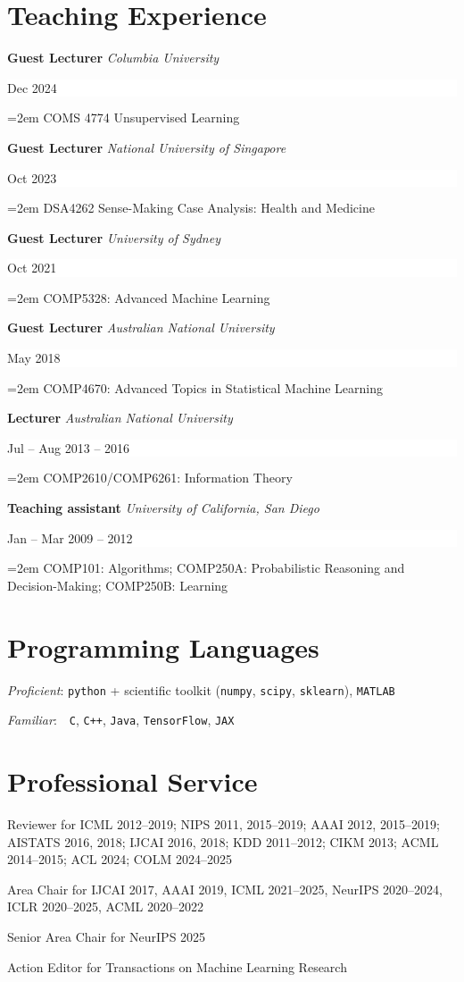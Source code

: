 \documentclass{article}
\newcommand{\NewPart}[1]{\section*{#1}}
\newcommand{\EducationEntry}[4]{
    \noindent \textbf{#1}
    \textit{#3}
    \hfill      %
    \colorbox{White}{
      \parbox{9em}{
      \hfill\color{Black}#2}} \par  %
    \noindent\hangindent=2em\hangafter=0 \small #4 %
    \normalsize \par}
\newcommand{\WorkEntry}[4]{       %
    \noindent
    \textbf{#1}
    \textit{#3} %
    \hfill      %
    \colorbox{White}{%
      \parbox{9em}{%
      \hfill\color{Black}#2}} \par   %
    \noindent\hangindent=2em\hangafter=0 \small #4 %
    \normalsize \par}
\begin{document}
\NewPart{Teaching Experience}{}

\WorkEntry
{Guest Lecturer}
{Dec 2024}
{Columbia University}
{
    COMS 4774  Unsupervised Learning
}

\WorkEntry
{Guest Lecturer}
{Oct 2023}
{National University of Singapore}
{
    DSA4262 Sense-Making Case Analysis: Health and Medicine
}

\WorkEntry
{Guest Lecturer}
{Oct 2021}
{University of Sydney}
{
    COMP5328: Advanced Machine Learning
}

\WorkEntry
{Guest Lecturer}
{May 2018}
{Australian National University}
{
    COMP4670: Advanced Topics in Statistical Machine Learning
}

\WorkEntry
{Lecturer}
{Jul -- Aug 2013 -- 2016}
{Australian National University}
{
    COMP2610/COMP6261: Information Theory
}

\WorkEntry
{Teaching assistant}
{Jan -- Mar 2009 -- 2012}
{University of California, San Diego}
{
    COMP101: Algorithms; COMP250A: Probabilistic Reasoning and Decision-Making; COMP250B: Learning
}

\NewPart{Programming Languages}{}

\emph{Proficient}: {{\tt python} + scientific toolkit ({\tt numpy}, {\tt scipy}, {\tt sklearn})},
{{\tt MATLAB}}

\noindent\emph{Familiar}: \,\ {\tt C}, {\tt C++}, {\tt Java},
{{\tt TensorFlow}},
{{\tt JAX}}


\NewPart{Professional Service}{}

\noindent
Reviewer for 
ICML 2012--2019; 
NIPS 2011, 2015--2019; 
AAAI 2012, 2015--2019; 
AISTATS 2016, 2018;
IJCAI 2016, 2018; 
KDD 2011--2012; 
CIKM 2013; 
ACML 2014--2015;
ACL 2024;
COLM 2024--2025

\medskip

\noindent
Area Chair for 
IJCAI 2017, 
AAAI 2019, 
ICML 2021--2025, 
NeurIPS 2020--2024, 
ICLR 2020--2025,
ACML 2020--2022

\medskip

\noindent
Senior Area Chair for 
NeurIPS 2025

\medskip

\noindent
Action Editor for Transactions on Machine Learning Research

\medskip
\end{document}
